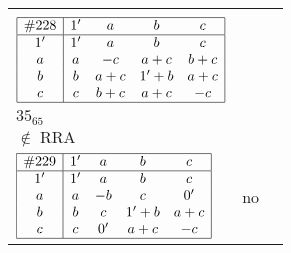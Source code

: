 \documentclass[12pt]{article}
\newcommand\RRA{\operatorname{RRA}}
\newcommand\notRRA{\ensuremath{\notin \RRA}}
\newcommand{\join}{\mathbin{+}}%
\newcommand{\id}{{1'}}%
\renewcommand{\div}{0'}
\begin{document}
\begin{center}
\begin{longtable}{l|c|c}
{\begin{tikzpicture}[<->,shorten <=1pt,shorten >=1pt,label distance=0mm, font=\small]
\end{tikzpicture}
}      \\[15mm]

$
\begin{array}{|c|cccc|} \hline
\#228 & \id & a & b & c \\ \hline
\id & \id & a & b & c \\
a & a & -c & a \join c & b \join c \\
b & b & a \join c & \id \join b & a \join c \\
c & c & b \join c & a \join c & -c \\ \hline
\end{array}
$
 & \begin{tabular}{c} yes \\ $35_{65}$ \\ \notRRA \end{tabular} 
 & \adjustbox{valign=c, max height=1.6cm}{$
\left[ \begin{array}{cccccc}
\id & a & a & b & c & b \\ 
a & \id & a & a & b & c \\ 
a & a & \id & a & c & c \\ 
b & a & a & \id & c & b \\ 
c & b & c & c & \id & a \\ 
b & c & c & b & a & \id
\end{array}\right]
$}      \\[15mm]

$
\begin{array}{|c|cccc|} \hline
\#229 & \id & a & b & c \\ \hline
\id & \id & a & b & c \\
a & a & -b & c & \div \\
b & b & c & \id \join b & a \join c \\
c & c & \div & a \join c & -c \\ \hline
\end{array}
$
 & no  
 & \adjustbox{valign=c, max height=1.6cm}{$
\left[ \begin{array}{cccccc}
\id & a & a & c & a & c \\ 
a & \id & a & a & c & c \\ 
a & a & \id & c & c & c \\ 
c & a & c & \id & b & b \\ 
a & c & c & b & \id & b \\ 
c & c & c & b & b & \id
\end{array}\right]
$}      \\[15mm]


\end{longtable}
\end{center}
\end{document}
